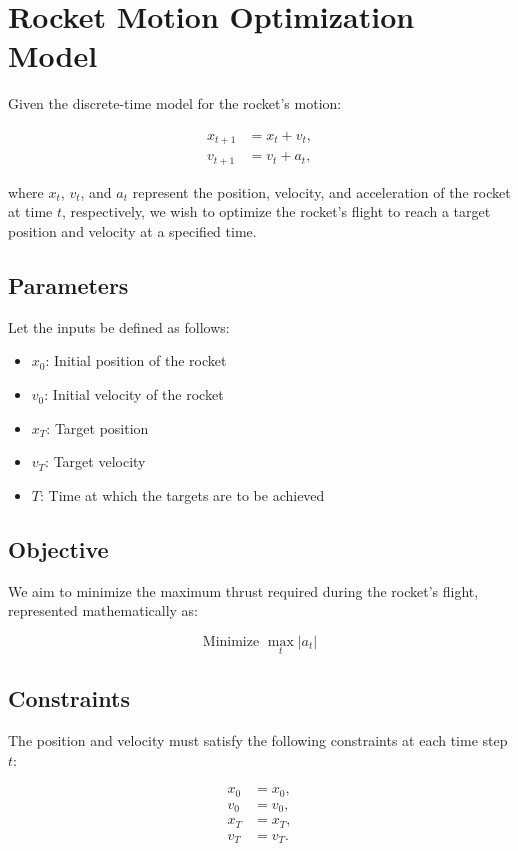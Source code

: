 \documentclass{article}
\begin{document}
\section*{Rocket Motion Optimization Model}

Given the discrete-time model for the rocket's motion:

\begin{align}
    x_{t+1} &= x_t + v_t, \\
    v_{t+1} &= v_t + a_t,
\end{align}

where \(x_t\), \(v_t\), and \(a_t\) represent the position, velocity, and acceleration of the rocket at time \(t\), respectively, we wish to optimize the rocket's flight to reach a target position and velocity at a specified time.

\subsection*{Parameters}
Let the inputs be defined as follows:

\begin{itemize}
    \item \(x_0\): Initial position of the rocket
    \item \(v_0\): Initial velocity of the rocket
    \item \(x_T\): Target position
    \item \(v_T\): Target velocity
    \item \(T\): Time at which the targets are to be achieved
\end{itemize}

\subsection*{Objective}
We aim to minimize the maximum thrust required during the rocket's flight, represented mathematically as:

\[
\text{Minimize } \max_t |a_t|
\]

\subsection*{Constraints}
The position and velocity must satisfy the following constraints at each time step \(t\):

\begin{align}
    x_0 &= x_0, \\
    v_0 &= v_0, \\
    x_{T} &= x_T, \\
    v_{T} &= v_T.
\end{align}
\end{document}
